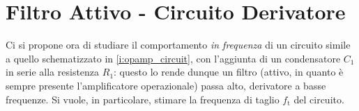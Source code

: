 \documentclass[a4paper,11pt]{article} %
\begin{document}
\section{Filtro Attivo - Circuito Derivatore}
Ci si propone ora di studiare il comportamento \textit{in frequenza} di un circuito simile a quello schematizzato in
\autoref{i:opamp_circuit}, con l'aggiunta di un condensatore $C_{1}$ in serie alla resistenza $R_{1}$: questo lo rende
dunque un filtro (attivo, in quanto è sempre presente l'amplificatore operazionale) passa alto, derivatore a basse
frequenze. Si vuole, in particolare, stimare la frequenza di taglio $f_{\text{t}}$ del circuito.

\end{document}
